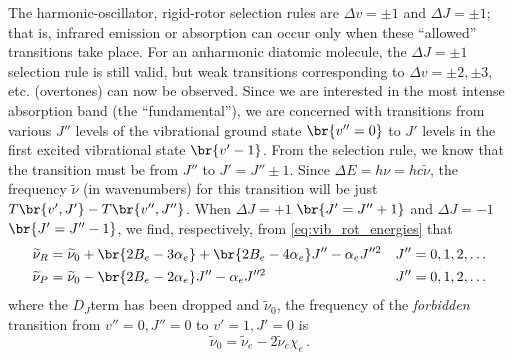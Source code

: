 \documentclass[nobib,nofonts,nols,nohyper]{tufte-handout}
\begin{document}
The harmonic-oscillator, rigid-rotor selection rules\autocite{herzberg89} are \( \Delta v = \pm 1 \) and \( \Delta J = \pm 1\); that is, infrared emission or absorption can occur only when these ``allowed'' transitions take place. 
For an anharmonic diatomic molecule, the \( \Delta J = \pm 1 \) selection rule is still valid, but weak transitions corresponding to \( \Delta v = \pm2, \pm3, \) etc. (overtones) can now be observed\autocite{herzberg89}. 
Since we are interested in the most intense absorption band (the ``fundamental''), we are concerned with transitions from various \( J'' \) levels of the vibrational ground state \( \br{v'' = 0} \) to \( J' \) levels in the first excited vibrational state \( \br{v' - 1} \). 
From the selection rule, we know that the transition must be from \( J'' \) to \( J' = J'' \pm 1 \). 
Since \( \Delta E = h \nu = h c \widetilde{\nu} \), the frequency \( \widetilde{\nu} \) (in wavenumbers) for this transition will be just \( T\br{v', J'} - T\br{v'', J''} \). When \( \Delta J = +1 \) \( \br{J' = J'' + 1} \) and \( \Delta J = -1 \) \( \br{J' = J'' - 1} \), we find, respectively, from \cref{eq:vib_rot_energies} that
\begin{align}
	\widetilde{\nu}_R &= \widetilde{\nu}_0 + \br{2 B_e - 3 \alpha_e} + \br{2 B_e - 4 \alpha_e} J'' - \alpha_e J''^2 	&	J'' &= 0, 1, 2, \ldots 
	\label{eq:r_branch} 
	\\
	\widetilde{\nu}_P &= \widetilde{\nu}_0 -													 \br{2 B_e - 2 \alpha_e} J'' - \alpha_e J''^2 	&	J'' &= 0, 1, 2, \ldots 
	\label{eq:p_branch}
\end{align}
where the \( D_J \)term has been dropped and \( \widetilde{\nu}_0 \), the frequency of the \emph{forbidden} transition from \( v'' = 0, J'' = 0 \) to \( v' = 1, J' = 0 \) is 
\begin{equation}
	\widetilde{\nu}_0 = \widetilde{\nu}_e - 2 \widetilde{\nu}_e \chi_e \, .
	\label{eq:forbid_transition}
\end{equation}
\end{document}
